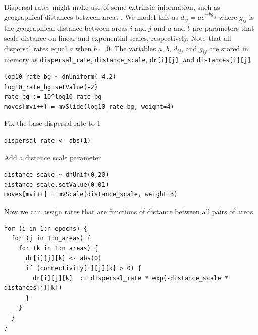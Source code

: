 
Dispersal rates might make use of some extrinsic information, such as geographical distances between areas \citep{macarthur67, webb12}.
We model this as $d_{ij} = a e ^ {-b g_{ij}}$ where $g_{ij}$ is the geographical distance between areas $i$ and $j$ and $a$ and $b$ are parameters that scale distance on linear and exponential scales, respectively. Note that all dispersal rates equal $a$ when $b=0$.
The variables $a$, $b$, $d_{ij}$, and $g_{ij}$ are stored in memory as {\tt dispersal\_rate}, {\tt distance\_scale}, {\tt dr[i][j]}, and {\tt distances[i][j]}.

\begin{snugshade}
\begin{lstlisting}
log10_rate_bg ~ dnUniform(-4,2)
log10_rate_bg.setValue(-2)
rate_bg := 10^log10_rate_bg
moves[mvi++] = mvSlide(log10_rate_bg, weight=4)
\end{lstlisting}
\end{snugshade}

Fix the base dispersal rate to 1

\begin{snugshade}
\begin{lstlisting}
dispersal_rate <- abs(1)
\end{lstlisting}
\end{snugshade}

Add a distance scale parameter

\begin{snugshade}
\begin{lstlisting}
distance_scale ~ dnUnif(0,20)
distance_scale.setValue(0.01)
moves[mvi++] = mvScale(distance_scale, weight=3)
\end{lstlisting}
\end{snugshade}

Now we can assign rates that are functions of distance between all pairs of areas

\begin{snugshade}
\begin{lstlisting}
for (i in 1:n_epochs) {
  for (j in 1:n_areas) {
    for (k in 1:n_areas) {
      dr[i][j][k] <- abs(0)
      if (connectivity[i][j][k] > 0) {
        dr[i][j][k]  := dispersal_rate * exp(-distance_scale * distances[j][k])
      }
    }
  }
}
\end{lstlisting}
\end{snugshade}



